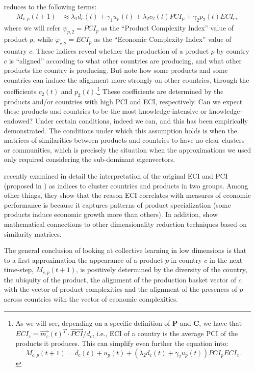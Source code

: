 \documentclass[12pt]{article}
\newcommand{\mtx}[1]{\mathbf{ #1}}
\begin{document}
 reduces to the following terms:
\begin{align*}
	M_{c,p}(t+1) &\approx \lambda_1 d_c(t) + \gamma_1 u_p(t) + \lambda_2 c_2(t) PCI_{p} + \gamma_2 p_2(t) ECI_{c},
\end{align*}
where we will refer $\psi_{p,2} = PCI_p$ as the ``Product Complexity Index'' value of product $p$, while $\varphi_{c,2} = ECI_p$ as the ``Economic Complexity Index'' value of country $c$. These indices reveal whether the production of a product $p$ by country $c$ is ``aligned'' according to what other countries are producing, and what other products the country is producing. But note how some products and some countries can induce the alignment more strongly on other countries, through the coefficients $c_2(t)$ and $p_2(t)$.\footnote{As we will see, depending on a specific definition of $\mtx{P}$ and $\mtx{C}$, we have that $ECI_c = \vec{m_c}(t)^T\cdot\vec{PCI}/d_c$, i.e., ECI of a country is the average PCI of the products it produces. This can simplify even further the equation into: $$M_{c,p}(t+1) = d_c(t) + u_p(t) + (\lambda_2 d_c(t)  + \gamma_2 u_p(t) )PCI_{p}ECI_{c}.$$} These coefficients are determined by the products and/or countries with high PCI and ECI, respectively. Can we expect these products and countries to be the most knowledge-intensive or knowledge-endowed? Under certain conditions, indeed we can, and this has been empirically demonstrated. The conditions under which this assumption holds is when the matrices of similarities between products and countries to have no clear clusters or communities, which is precisely the situation when the approximations we used only required considering the sub-dominant eigenvectors.

\citet{mealy2017new} recently examined in detail the interpretation of the original ECI and PCI (proposed in \citet{hausman2011atlas}) as indices to cluster countries and products in two groups. Among other things, they show that the reason ECI correlates with measures of economic performance is because it captures patterns of product specialization (some products induce economic growth more than others). In addition, \citet{mealy2017new} show mathematical connections to other dimensionality reduction techniques based on similarity matrices.

The general conclusion of looking at collective learning in low dimensions is that to a first approximation the appearance of a product $p$ in country $c$ in the next time-step, $M_{c,p}(t+1)$, is positively determined by the diversity of the country, the ubiquity of the product, the alignment of the production basket vector of $c$ with the vector of product complexities and the alignment of the presences of $p$ across countries with the vector of economic complexities. 
\end{document}
